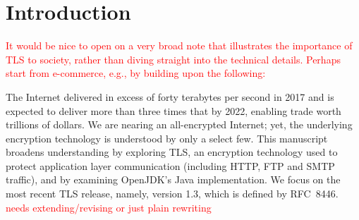 \section{Introduction}\label{sec:intro}

\ifPresentationNotes
\textcolor{red}{
 It would be nice to open on a very broad note that illustrates the importance
 of TLS to society, rather than diving straight into the technical details.
 Perhaps start from e-commerce, e.g., by building upon the following:
}
%
%
\begin{comment}
The e-commerce market was valued at over twenty trillion US dollars in 2016
and is forecast to double in value by 2022, with business-to-business
sales accounting for over eighty percent of the market share. 
That market is reliant on secure communication, which can be achieved using
TLS.
\end{comment}
%
%
%
The Internet delivered in excess of forty terabytes per second in 2017 
and is expected to deliver more than three times that by 2022, %
enabling trade worth trillions of dollars. %
\fi
%
We are nearing an all-encrypted Internet; 
yet, the underlying encryption technology %
is understood by only a select few. 
This manuscript broadens understanding by exploring TLS, an encryption technology 
used to protect application layer communication (including HTTP, FTP and SMTP traffic), 
and by examining OpenJDK's Java implementation. 
We focus on the most recent TLS release, namely, version 1.3, which is defined by RFC~8446.
\ifPresentationNotes
\textcolor{red}{needs extending/revising or just plain rewriting}
\fi


